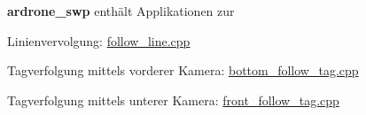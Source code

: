 

{\bfseries ardrone\_\-swp} enthält Applikationen zur 
\begin{DoxyItemize}
\item Linienvervolgung: \hyperlink{follow__line_8cpp}{follow\_\-line.cpp} 
\item Tagverfolgung mittels vorderer Kamera: \hyperlink{bottom__follow__tag_8cpp}{bottom\_\-follow\_\-tag.cpp} 
\item Tagverfolgung mittels unterer Kamera: \hyperlink{front__follow__tag_8cpp}{front\_\-follow\_\-tag.cpp} 
\end{DoxyItemize}